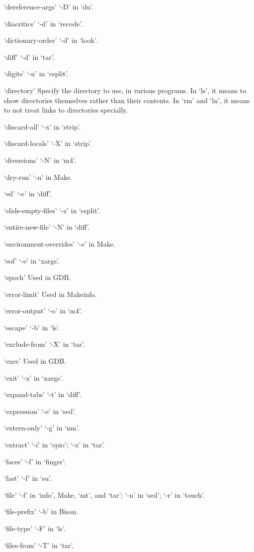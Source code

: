 `dereference-args'
     `-D' in `du'.

`diacritics'
     `-d' in `recode'.

`dictionary-order'
     `-d' in `look'.

`diff'
     `-d' in `tar'.

`digits'
     `-n' in `csplit'.

`directory'
     Specify the directory to use, in various programs.  In `ls', it
     means to show directories themselves rather than their contents.
     In `rm' and `ln', it means to not treat links to directories
     specially.

`discard-all'
     `-x' in `strip'.

`discard-locals'
     `-X' in `strip'.

`diversions'
     `-N' in `m4'.

`dry-run'
     `-n' in Make.

`ed'
     `-e' in `diff'.

`elide-empty-files'
     `-z' in `csplit'.

`entire-new-file'
     `-N' in `diff'.

`environment-overrides'
     `-e' in Make.

`eof'
     `-e' in `xargs'.

`epoch'
     Used in GDB.

`error-limit'
     Used in Makeinfo.

`error-output'
     `-o' in `m4'.

`escape'
     `-b' in `ls'.

`exclude-from'
     `-X' in `tar'.

`exec'
     Used in GDB.

`exit'
     `-x' in `xargs'.

`expand-tabs'
     `-t' in `diff'.

`expression'
     `-e' in `sed'.

`extern-only'
     `-g' in `nm'.

`extract'
     `-i' in `cpio'; `-x' in `tar'.

`faces'
     `-f' in `finger'.

`fast'
     `-f' in `su'.

`file'
     `-f' in `info', Make, `mt', and `tar'; `-n' in `sed'; `-r' in
     `touch'.

`file-prefix'
     `-b' in Bison.

`file-type'
     `-F' in `ls'.

`files-from'
     `-T' in `tar'.

